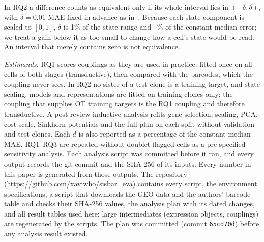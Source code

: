 \documentclass[10pt,journal,compsoc]{IEEEtran}
\begin{document}
In RQ2 a difference counts as equivalent only if its whole interval lies in $(-\delta,\delta)$,
with $\delta=0.01$ MAE fixed in advance as in~\cite{Kanu_TCBB}. Because each state
component is scaled to $[0,1]$, $\delta$ is 1\% of the state range and
\rqTwoDeltaPctOne--\rqTwoDeltaPctThree\% of the constant-median error; we treat a gain below it as too small to change how a cell's state
would be read. An interval that merely contains zero is not equivalence.

\emph{Estimands.} RQ1 scores couplings as they are used in practice: fitted once on all
cells of both stages (transductive), then compared with the barcodes, which the coupling
never sees. In RQ2 no sister of a test clone is a training target, and state scaling,
models and representations are fitted on training clones only; the coupling that supplies
OT training targets is the RQ1 coupling and therefore transductive. A post-review
inductive analysis refits gene selection, scaling, PCA, cost scale, Sinkhorn potentials and
the full plan on each split without validation and test clones. Each $\bar d$ is also reported as a percentage of the
constant-median MAE. RQ1--RQ3 are repeated without doublet-flagged cells as a pre-specified
sensitivity analysis. Each analysis script was committed before it ran, and every output
records the git commit and the SHA-256 of its inputs. Every number in this paper is
generated from those outputs. The repository (\url{https://github.com/xaviwho/sisbar_eva})
contains every script, the environment specifications, a script that downloads the GEO data
and the authors' barcode table and checks their SHA-256 values, the analysis plan with its
dated changes, and all result tables used here; large intermediates (expression objects,
couplings) are regenerated by the scripts. The plan was committed (commit
\texttt{65cd70d}) before any analysis result existed.
\end{document}
